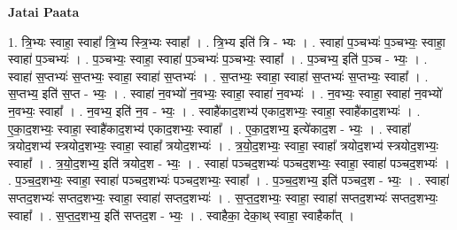 \documentclass[17pt]{extarticle}
\begin{document}
\textbf{Jatai Paata} \newline

1. त्रि॒भ्यः स्वाहा॒ स्वाहा᳚ त्रि॒भ्य स्त्रि॒भ्यः स्वाहा᳚ । . त्रि॒भ्य इति॑ त्रि - भ्यः । . स्वाहा॑ प॒ञ्चभ्यः॑ प॒ञ्चभ्यः॒ स्वाहा॒ स्वाहा॑ प॒ञ्चभ्यः॑ । . प॒ञ्चभ्यः॒ स्वाहा॒ स्वाहा॑ प॒ञ्चभ्यः॑ प॒ञ्चभ्यः॒ स्वाहा᳚ । . प॒ञ्चभ्य॒ इति॑ प॒ञ्च - भ्यः॒ । . स्वाहा॑ स॒प्तभ्यः॑ स॒प्तभ्यः॒ स्वाहा॒ स्वाहा॑ स॒प्तभ्यः॑ । . स॒प्तभ्यः॒ स्वाहा॒ स्वाहा॑ स॒प्तभ्यः॑ स॒प्तभ्यः॒ स्वाहा᳚ । . स॒प्तभ्य॒ इति॑ स॒प्त - भ्यः॒ । . स्वाहा॑ न॒वभ्यो॑ न॒वभ्यः॒ स्वाहा॒ स्वाहा॑ न॒वभ्यः॑ । . न॒वभ्यः॒ स्वाहा॒ स्वाहा॑ न॒वभ्यो॑ न॒वभ्यः॒ स्वाहा᳚ । . न॒वभ्य॒ इति॑ न॒व - भ्यः॒ । . स्वाहै॑काद॒शभ्य॑ एकाद॒शभ्यः॒ स्वाहा॒ स्वाहै॑काद॒शभ्यः॑ । . ए॒का॒द॒शभ्यः॒ स्वाहा॒ स्वाहै॑काद॒शभ्य॑ एकाद॒शभ्यः॒ स्वाहा᳚ । . ए॒का॒द॒शभ्य॒ इत्ये॑काद॒श - भ्यः॒ । . स्वाहा᳚ त्रयोद॒शभ्य॑ स्त्रयोद॒शभ्यः॒ स्वाहा॒ स्वाहा᳚ त्रयोद॒शभ्यः॑ । . त्र॒यो॒द॒शभ्यः॒ स्वाहा॒ स्वाहा᳚ त्रयोद॒शभ्य॑ स्त्रयोद॒शभ्यः॒ स्वाहा᳚ । . त्र॒यो॒द॒शभ्य॒ इति॑ त्रयोद॒श - भ्यः॒ । . स्वाहा॑ पञ्चद॒शभ्यः॑ पञ्चद॒शभ्यः॒ स्वाहा॒ स्वाहा॑ पञ्चद॒शभ्यः॑ । . प॒ञ्च॒द॒शभ्यः॒ स्वाहा॒ स्वाहा॑ पञ्चद॒शभ्यः॑ पञ्चद॒शभ्यः॒ स्वाहा᳚ । . प॒ञ्च॒द॒शभ्य॒ इति॑ पञ्चद॒श - भ्यः॒ । . स्वाहा॑ सप्तद॒शभ्यः॑ सप्तद॒शभ्यः॒ स्वाहा॒ स्वाहा॑ सप्तद॒शभ्यः॑ । . स॒प्त॒द॒शभ्यः॒ स्वाहा॒ स्वाहा॑ सप्तद॒शभ्यः॑ सप्तद॒शभ्यः॒ स्वाहा᳚ । . स॒प्त॒द॒शभ्य॒ इति॑ सप्तद॒श - भ्यः॒ । . स्वाहैका॒ देका॒थ् स्वाहा॒ स्वाहैका᳚त् । \newline
\end{document}
